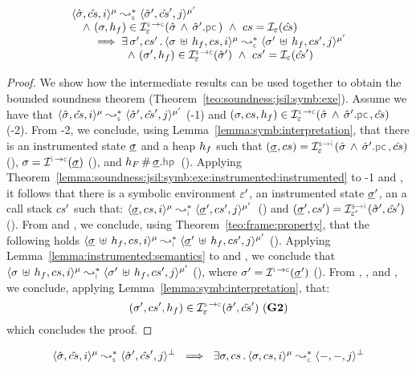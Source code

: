 \begin{temax}
$$
\begin{array}{l}
 \transabssemrule{\sstate, \scs, i}{\sstate', \scs', j}{\mode}{\mode'}{\symbolic} 
    \\ \quad \wedge \ (\jstate, \heap_f) \in \interpret{\symbconc}{\senv}(\sstate \, \wedge \, \sstate'.\pcsel) \ \wedge \ \cs = \shorthand(\scs) \\ \qquad \implies \exists \, \jstate', \cs' \, . \,
       \transabssemrule{\jstate \dunion \heap_f, \cs, i}{\jstate' \dunion \heap_f, \cs', j}{\mode}{\mode'}{\concrete} \\ \qquad \qquad \quad
               \wedge \ (\jstate', \heap_f) \in \interpret{\symbconc}{\senv}(\sstate')
               \ \wedge \ \cs' = \shorthand(\scs')
\end{array}
$$
\end{temax}
\begin{proof}
We show how the intermediate results can be used together to 
obtain the bounded soundness theorem (Theorem~\ref{teo:soundness:jsil:symb:exe}). 
Assume we have that 
$\transabssemrule{\sstate, \scs, i}{\sstate', \scs', j}{\mode}{\mode'}{\symbolic}$ (\hyp{1}) and 
 $(\jstate, \cs, \heap_f) \in \interpret{\symbconc}{\senv}(\sstate \, \wedge \, \sstate'.\pcsel, \scs)$ (\hyp{2}).  
 From \hyp{2}, we conclude, using Lemma~\ref{lemma:symb:interpretation}, that there is an 
 instrumented state $\underline{\sigma}$ and a heap $h_f$ such that $(\istate, \cs) = \interpret{\symbinst}{\senv}(\sstate  \, \wedge \, \sstate'.\pcsel, \scs)$ (), 
 $\jstate = \interpret{\instconc}{}(\istate)$ (), and $h_F \disjoint \istate.\hpsel$ (). 
 Applying Theorem~\ref{lemma:soundness:jsil:symb:exe:instrumented:instrumented} to \hyp{1} 
 and , it follows that there is a symbolic environment $\varepsilon'$, an instrumented state $\underline{\sigma}'$, 
 an a call stack $cs'$ such that: 
$\transabssemrule{\istate, \cs, i}{\istate', \cs', j}{\mode}{\mode'}{\instrumented}$~()
and $(\istate', \cs') = \interpret{\symbinst}{\senv'}(\sstate', \scs')$ ().
From  and , we conclude, using Theorem~\ref{teo:frame:property}, that the following 
holds $\transabssemrule{\istate \dunion \heap_f, \cs, i}{\istate' \dunion \heap_f, \cs', j}{\mode}{\mode'}{\instrumented}$ (). 
Applying Lemma~\ref{lemma:instrumented:semantics} to  and , we conclude that 
 $\transabssemrule{\jstate \dunion \heap_f, \cs, i}{\jstate' \dunion \heap_f, \cs', j}{\mode}{\mode'}{\instrumented}$ (), 
 where $\jstate' = \interpret{\instconc}{}(\istate')$ ().
 From , , and , we conclude, applying Lemma~\ref{lemma:symb:interpretation}, 
 that:
 $$(\jstate', \cs', \heap_f) \in \interpret{\symbconc}{\senv}(\sstate', \scs') \text{ (\goal{2})}$$  
 which concludes the proof. 
\end{proof}

%
\begin{cormax}
$$
\transabssemrule{\sstate, \scs, i}{\sstate', \scs', j}{\mode}{\bot}{\symbolic}  
      \ \implies \  \exists \jstate, \cs \, . \, \transabssemrule{\jstate, \cs, i}{-, -, j}{\mode}{\bot}{\concrete}  
$$
\end{cormax}

